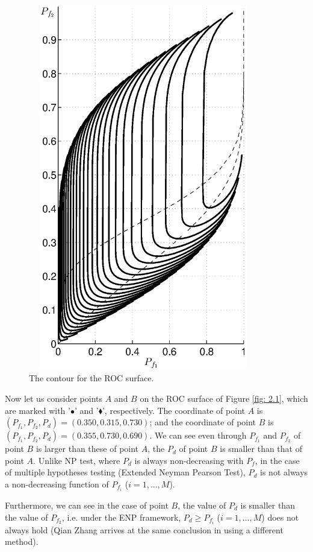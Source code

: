 \begin{figure}[!t]
\centering
\includegraphics[width = 10cm, height=16cm]{2/ex3.eps}
\caption{The contour for the ROC surface.}
\label{fig: 2.3mar9}
\end{figure}

Now let us consider points $A$ and $B$ on the ROC surface of Figure \ref{fig: 2.1}, which are marked with '$\bullet$' and '$\blacklozenge$', respectively.  The coordinate of point $A$ is $(P_{f_1}, P_{f_2}, P_d) = (0.350, 0.315, 0.730)$; and the coordinate of point $B$ is  $(P_{f_1}, P_{f_2}, P_d) = (0.355, 0.730, 0.690)$. We can see even through $P_{f_1}$ and $P_{f_2}$ of point $B$ is larger than these of point $A$, the $P_d$ of point $B$ is  smaller than that of point $A$.  
Unlike NP test, where $P_d$ is always non-decreasing with $P_f$, in the case of multiple hypotheses testing (Extended Neyman Pearson Test), $P_d$ is not always a non-decreasing function of  $P_{f_i}$ ($i=1, ..., M$).

Furthermore, we can see in the case of point $B$, the value of $P_d$ is smaller than the value of $P_{f_2}$, i.e. under the ENP framework, $P_d \geq P_{f_i}$  ($i = 1, ..., M$) does not always hold (Qian Zhang arrives at the same conclusion in  \cite{zhang1999design, zhang2000efficient} using a different method). 

